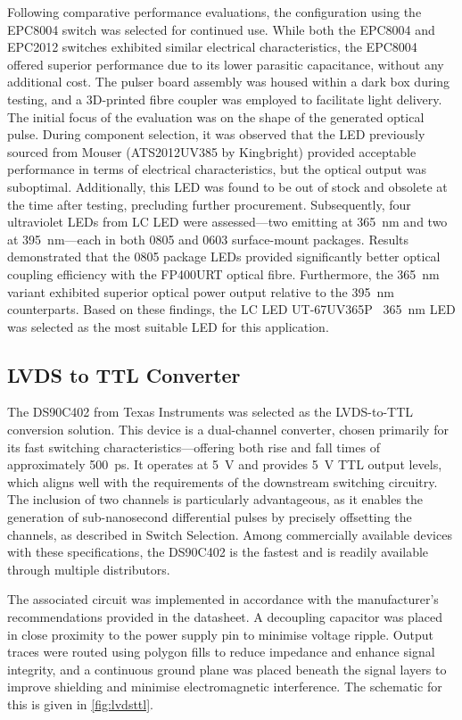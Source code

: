\documentclass[a4paper,11pt]{article}
\begin{document}
Following comparative performance evaluations, the configuration using the EPC8004 switch was selected for continued use. While both the EPC8004 and EPC2012 switches exhibited similar electrical characteristics, the EPC8004 offered superior performance due to its lower parasitic capacitance, without any additional cost.
The pulser board assembly was housed within a dark box during testing, and a 3D-printed fibre coupler was employed to facilitate light delivery. The initial focus of the evaluation was on the shape of the generated optical pulse.
During component selection, it was observed that the LED previously sourced from Mouser (ATS2012UV385 by Kingbright) provided acceptable performance in terms of electrical characteristics, but the optical output was suboptimal. Additionally, this LED was found to be out of stock and obsolete at the time after testing, precluding further procurement. Subsequently, four ultraviolet LEDs from LC LED were assessed—two emitting at 365~nm and two at 395~nm—each in both 0805 and 0603 surface-mount packages. Results demonstrated that the 0805 package LEDs provided significantly better optical coupling efficiency with the FP400URT optical fibre. Furthermore, the 365~nm variant exhibited superior optical power output relative to the 395~nm counterparts.
Based on these findings, the LC LED UT-67UV365P~\cite{ut-67uv365p} 365~nm LED was selected as the most suitable LED for this application.



\subsection{LVDS to TTL Converter}

The DS90C402 \cite{DS90C402} from Texas Instruments was selected as the LVDS-to-TTL conversion solution. This device is a dual-channel converter, chosen primarily for its fast switching characteristics—offering both rise and fall times of approximately 500~ps. It operates at 5~V and provides 5~V TTL output levels, which aligns well with the requirements of the downstream switching circuitry. The inclusion of two channels is particularly advantageous, as it enables the generation of sub-nanosecond differential pulses by precisely offsetting the channels, as described in Switch Selection. Among commercially available devices with these specifications, the DS90C402 is the fastest and is readily available through multiple distributors.

The associated circuit was implemented in accordance with the manufacturer's recommendations provided in the datasheet. A decoupling capacitor was placed in close proximity to the power supply pin to minimise voltage ripple. Output traces were routed using polygon fills to reduce impedance and enhance signal integrity, and a continuous ground plane was placed beneath the signal layers to improve shielding and minimise electromagnetic interference. The schematic for this is given in \cref{fig:lvdsttl}.
\end{document}

